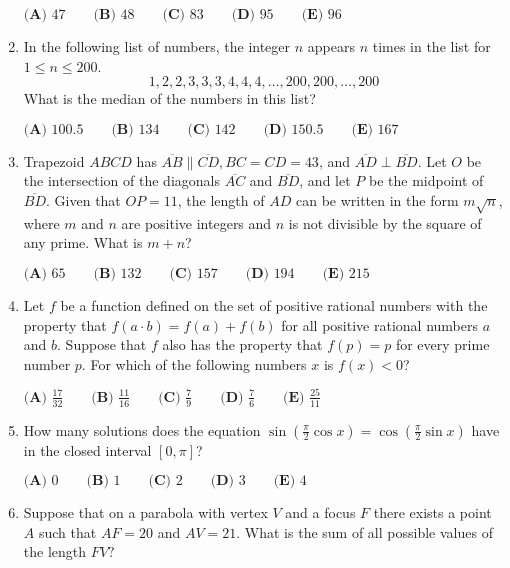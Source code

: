 \documentclass{article}
\begin{document}
\begin{enumerate}[label=\arabic*., itemsep=0.5em]
$\textbf{(A) } 47\qquad\textbf{(B) } 48\qquad\textbf{(C) } 83\qquad\textbf{(D) } 95\qquad\textbf{(E) } 96\qquad$\par \vspace{0.5em}\item In the following list of numbers, the integer $n$ appears $n$ times in the list for $1\le n \le 200$.
\begin{equation*}
1,2,2,3,3,3,4,4,4,\ldots,200,200,\ldots,200
\end{equation*}
What is the median of the numbers in this list?

$\textbf{(A) }100.5 \qquad \textbf{(B) }134 \qquad \textbf{(C) }142 \qquad \textbf{(D) }150.5\qquad \textbf{(E) }167$\par \vspace{0.5em}\item Trapezoid $ABCD$ has $\overline{AB}\parallel\overline{CD},BC=CD=43$, and $\overline{AD}\perp\overline{BD}$. Let $O$ be the intersection of the diagonals $\overline{AC}$ and $\overline{BD}$, and let $P$ be the midpoint of $\overline{BD}$. Given that $OP=11$, the length of $AD$ can be written in the form $m\sqrt{n}$, where $m$ and $n$ are positive integers and $n$ is not divisible by the square of any prime. What is $m+n$?

$\textbf{(A) }65 \qquad \textbf{(B) }132 \qquad \textbf{(C) }157 \qquad \textbf{(D) }194\qquad \textbf{(E) }215$\par \vspace{0.5em}\item Let $f$ be a function defined on the set of positive rational numbers with the property that $f(a\cdot b)=f(a)+f(b)$ for all positive rational numbers $a$ and $b$. Suppose that $f$ also has the property that $f(p)=p$ for every prime number $p$. For which of the following numbers $x$ is $f(x)<0$?

$\textbf{(A) }\frac{17}{32} \qquad \textbf{(B) }\frac{11}{16} \qquad \textbf{(C) }\frac79 \qquad \textbf{(D) }\frac76\qquad \textbf{(E) }\frac{25}{11}$\par \vspace{0.5em}\item How many solutions does the equation $\sin \left( \frac{\pi}2 \cos x\right)=\cos \left( \frac{\pi}2 \sin x\right)$ have in the closed interval $[0,\pi]$?

$\textbf{(A) }0 \qquad \textbf{(B) }1 \qquad \textbf{(C) }2 \qquad \textbf{(D) }3\qquad \textbf{(E) }4$\par \vspace{0.5em}\item Suppose that on a parabola with vertex $V$ and a focus $F$ there exists a point $A$ such that $AF=20$ and $AV=21$. What is the sum of all possible values of the length $FV?$


\end{enumerate}
\end{document}
